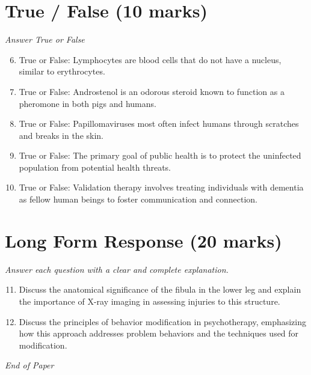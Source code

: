 \documentclass[12pt]{article}
\begin{document}
\section*{True / False (10 marks)}
\textit{Answer True or False}
\begin{enumerate}[label=\arabic*.]
\setcounter{enumi}{5}
\item True or False: Lymphocytes are blood cells that do not have a nucleus, similar to erythrocytes.
\item True or False: Androstenol is an odorous steroid known to function as a pheromone in both pigs and humans.
\item True or False: Papillomaviruses most often infect humans through scratches and breaks in the skin.
\item True or False: The primary goal of public health is to protect the uninfected population from potential health threats.
\item True or False: Validation therapy involves treating individuals with dementia as fellow human beings to foster communication and connection.
\end{enumerate}

\section*{Long Form Response (20 marks)}
\textit{Answer each question with a clear and complete explanation.}
\begin{enumerate}[label=\arabic*.]
\setcounter{enumi}{10}
\item Discuss the anatomical significance of the fibula in the lower leg and explain the importance of X-ray imaging in assessing injuries to this structure.
\item Discuss the principles of behavior modification in psychotherapy, emphasizing how this approach addresses problem behaviors and the techniques used for modification.
\end{enumerate}

\vfill
\noindent\textit{End of Paper}
\end{document}
